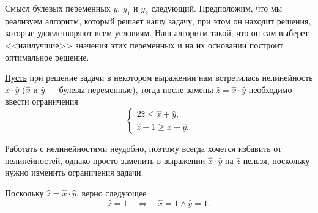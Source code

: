 \remark

Смысл булевых переменных $y$, $y_1$ и $y_2$ следующий.  Предположим, что мы реализуем алгоритм, который решает нашу задачу, при этом он находит решения, которые удовлетворяют всем условиям. Наш алгоритм  такой, что он сам выберет <<наилучшие>> значения этих переменных и на их основании построит оптимальное решение.

\label{fact:substituion_of_nonlinear}

\underline{Пусть} при решение задачи в некотором выражении нам встретилась нелинейность $\hat{x} \cdot \hat{y}$ ($\hat{x}$ и $\hat{y}$ --- булевы переменные), \underline{тогда} после замены $\hat{z} = \hat{x} \cdot \hat{y}$ необходимо ввести ограничения
\[
\begin{cases}
	2\hat{z} \le \hat{x} + \hat{y}, \\
	\hat{z} + 1 \ge \hat{x} + \hat{y}.
\end{cases}
\]

\begin{note}
	Работать с нелинейностями неудобно, поэтому всегда хочется избавить от нелинейностей, однако просто заменить в выражении $\hat{x} \cdot \hat{y}$ на $\hat{z}$ нельзя, поскольку нужно изменить ограничения задачи. 
\end{note}

\prooof

Поскольку $\hat{z} = \hat{x} \cdot \hat{y}$, верно следующее
\[
\hat{z} = 1 \quad \Longleftrightarrow \quad \hat{x} = 1 \land \hat{y} = 1.
\]

